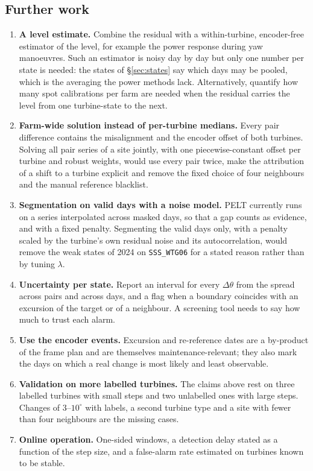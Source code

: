 \documentclass[11pt,a4paper]{article}
\theoremstyle{remark}
\newcommand{\dg}{^{\circ}}
\newcommand{\code}[1]{\texttt{#1}}
\begin{document}
\subsection{Further work}
\begin{enumerate}
\item \textbf{A level estimate.} Combine the residual with a within-turbine,
      encoder-free estimator of the level, for example the power response
      during yaw manoeuvres. Such an estimator is noisy day by day but only
      one number per state is needed: the states of \S\ref{sec:states} say
      which days may be pooled, which is the averaging the power methods lack.
      Alternatively, quantify how many spot calibrations per farm are needed
      when the residual carries the level from one turbine-state to the next.
\item \textbf{Farm-wide solution instead of per-turbine medians.} Every pair
      difference contains the misalignment and the encoder offset of both
      turbines. Solving all pair series of a site jointly, with one
      piecewise-constant offset per turbine and robust weights, would use
      every pair twice, make the attribution of a shift to a turbine explicit
      and remove the fixed choice of four neighbours and the manual reference
      blacklist.
\item \textbf{Segmentation on valid days with a noise model.} PELT currently
      runs on a series interpolated across masked days, so that a gap counts
      as evidence, and with a fixed penalty. Segmenting the valid days only,
      with a penalty scaled by the turbine's own residual noise and its
      autocorrelation, would remove the weak states of 2024 on
      \code{SSS\_WTG06} for a stated reason rather than by tuning $\lambda$.
\item \textbf{Uncertainty per state.} Report an interval for every
      $\Delta\theta$ from the spread across pairs and across days, and a flag
      when a boundary coincides with an excursion of the target or of a
      neighbour. A screening tool needs to say how much to trust each alarm.
\item \textbf{Use the encoder events.} Excursion and re-reference dates are a
      by-product of the frame plan and are themselves maintenance-relevant;
      they also mark the days on which a real change is most likely and least
      observable.
\item \textbf{Validation on more labelled turbines.} The claims above rest on
      three labelled turbines with small steps and two unlabelled ones with
      large steps. Changes of $3$--$10\dg$ with labels, a second turbine
      type and a site with fewer than four neighbours are the missing cases.
\item \textbf{Online operation.} One-sided windows, a detection delay stated
      as a function of the step size, and a false-alarm rate estimated on
      turbines known to be stable.
\end{enumerate}
\end{document}
